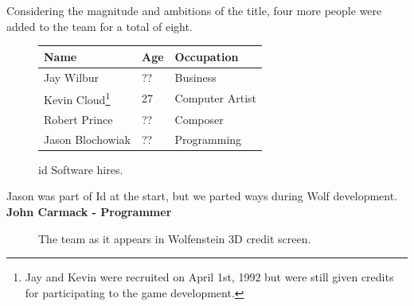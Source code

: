 \documentclass[book.tex]{subfiles}
\begin{document}
Considering the magnitude and ambitions of the title, four more people were added to the team for a total of eight.\\

 \begin{figure}[H]
\centering  
\begin{tabularx}{\textwidth}{ X  X  X  }
  \toprule
  \textbf{Name} &  \textbf{Age} & \textbf{Occupation} \\
  \toprule 
   Jay Wilbur & ?? &  Business\\
   Kevin Cloud\footnote{Jay and Kevin were recruited on April 1st, 1992 but were still given credits for participating to the game development.} & 27 &  Computer Artist\\
   Robert Prince & ?? &  Composer\\
   Jason Blochowiak & ?? &   Programming\\
     \toprule
\end{tabularx}
\caption{id Software hires.}\label{fig:Id Software hires}
\end{figure}
\begin{fancyquotes}
Jason was part of Id at the start, but we parted ways during Wolf development.
 \bigskip \\
\textbf{John Carmack - Programmer}
 \end{fancyquotes}
 
\begin{figure}[H]
\centering
\caption{The team as it appears in Wolfenstein 3D credit screen.}
\label{fig:id_team_1993}
\end{figure}
 
\end{document}
